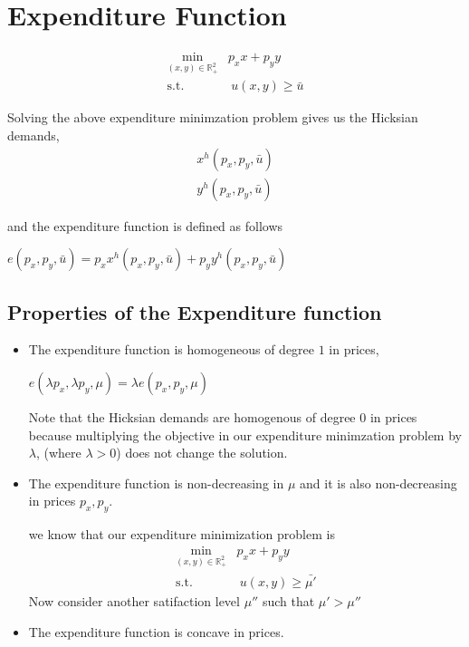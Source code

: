 \documentclass[12pt,a4paper]{article}
\begin{document}
\section{Expenditure Function}
\begin{tcolorbox}
     \begin{align*}
        \min_{(x,y)\in \mathbb{R}^2_{+}}& p_{x}x+p_{y}y\\
        \text{s.t.}& \ u(x,y) \geq  \bar{u}  
    \end{align*}
\end{tcolorbox}
Solving the above expenditure minimzation problem gives us the Hicksian demands,
 \begin{align*}
    x^h(p_{x},p_{y}, \bar{u} )\\
    y^h(p_{x},p_{y},  \bar{u} )  
\end{align*}

and the expenditure function is defined as follows 

\(e(p_{x},p_{y}, \bar{u} ) = p_{x}x^h(p_{x},p_{y}, \bar{u} ) + p_{y}y^h(p_{x},p_{y}, \bar{u} )   \)  

\subsection{Properties of the Expenditure function}
\begin{itemize}
    \item  The expenditure function is homogeneous of degree \(1\) in prices,
    
    \(e(\lambda p_{x},\lambda p_{y}, \mu ) = \lambda e(p_{x}, p_{y}, \mu)\)
    
    Note that the Hicksian demands are homogenous of degree \(0\) in prices because multiplying the objective in our expenditure minimzation problem by \(\lambda\), (where \(\lambda > 0\)) does not change the solution.
    
    \item The expenditure function is non-decreasing in \(\mu\) and it is also non-decreasing in prices \(p_{x},p_{y}\).
    
    we know that our expenditure minimization problem is
    \begin{align*}
        \min_{(x,y)\in \mathbb{R}^2_{+}}& p_{x}x+p_{y}y\\
        \text{s.t.}& \ u(x,y) \geq  \bar{\mu '}  
    \end{align*} 
    Now consider another satifaction level \(\mu '' \) such that \(\mu ' > \mu ''\) 

    \item The expenditure function is concave in prices.
\end{itemize}
\end{document}

